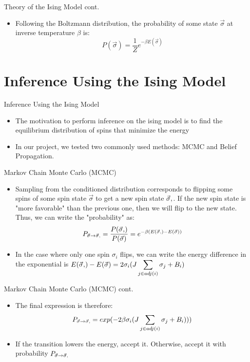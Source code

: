 \documentclass{minesbeamer}
\begin{document}
\begin{frame}{Theory of the Ising Model cont.}
    \centering
    \begin{itemize}
        \item Following the Boltzmann distribution, the probability of some state $\vec{\sigma}$ at inverse temperature $\beta$ is:$$P(\vec{\sigma}) = \frac{1}{Z}e^{-\beta E(\vec{\sigma})}$$
    \end{itemize}
\end{frame}

\section{Inference Using the Ising Model}

\begin{frame}{Inference Using the Ising Model}
    \centering
    \begin{itemize}
        \item The motivation to perform inference on the ising model is to find the equilibrium distribution of spins that minimize the energy
        \item In our project, we tested two commonly used methods: MCMC and Belief Propagation.
    \end{itemize}
\end{frame}

\begin{frame}{Markov Chain Monte Carlo (MCMC)}
    \centering
    \begin{itemize}
        \item Sampling from the conditioned distribution corresponds to flipping some spins of some spin state $\vec{\sigma}$ to get a new spin state $\vec{\sigma}\textsc{\char13}$. If the new spin state is "more favorable" than the previous one, then we will flip to the new state. Thus, we can write the "probability" as: $$P_{\vec{\sigma} \to \vec{\sigma}\textsc{\char13}} = \frac{P(\vec{\sigma}\textsc{\char13})}{P(\vec{\sigma})}= e^{-\beta(E(\vec{\sigma}\textsc{\char13})-E(\vec{\sigma}))}$$ 
        \item In the case where only one spin $\sigma_i$ flips, we can write the energy difference in the exponential is $\displaystyle E(\vec{\sigma}\textsc{\char13})-E(\vec{\sigma}) = 2\sigma_i(J \sum_{j\in adj(i)} \sigma_j + B_i )$
    \end{itemize}
\end{frame}

\begin{frame}{Markov Chain Monte Carlo (MCMC) cont.}
    \centering
    \begin{itemize}
        \item The final expression is therefore: $$P_{\vec{\sigma} \to \vec{\sigma}\textsc{\char13}} = exp(-2\beta\sigma_i(J \sum_{j\in adj(i)} \sigma_j + B_i )))$$ 
        \item If the transition lowers the energy, accept it. Otherwise, accept it with probability $P_{\vec{\sigma} \to \vec{\sigma}\textsc{\char13}}$ 
    \end{itemize}
\end{frame}
\end{document}
